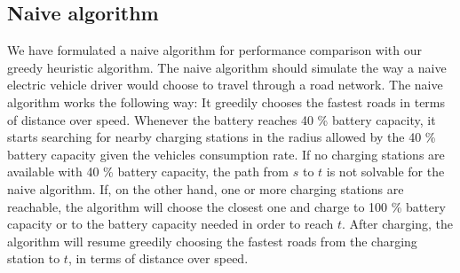 \subsection{Naive algorithm}
\label{sub:naivealgorithm}
We have formulated a naive algorithm for performance comparison with our greedy heuristic algorithm. The naive algorithm should simulate the way a naive electric vehicle driver would choose to travel through a road network. The naive algorithm works the following way: It greedily chooses the fastest roads in terms of distance over speed. Whenever the battery reaches 40 \% battery capacity, it starts searching for nearby charging stations in the radius allowed by the 40 \% battery capacity given the vehicles consumption rate. If no charging stations are available with 40 \% battery capacity, the path from $s$ to $t$ is not solvable for the naive algorithm. If, on the other hand, one or more charging stations are reachable, the algorithm will choose the closest one and charge to 100 \% battery capacity or to the battery capacity needed in order to reach $t$. After charging, the algorithm will resume greedily choosing the fastest roads from the charging station to $t$, in terms of distance over speed.